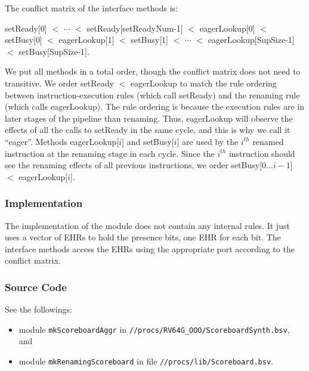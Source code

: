The conflict matrix of the interface methods is:
\begin{center}
    setReady[0] $<$ $\cdots$ $<$ setReady[setReadyNum-1] $<$ eagerLookup[0] $<$ setBusy[0] $<$ eagerLookup[1] $<$ setBusy[1] $<$ $\cdots$ $<$ eagerLookup[SupSize-1] $<$ setBusy[SupSize-1].
\end{center}
We put all methods in a total order, though the conflict matrix does not need to transitive.
We order setReady $<$ eagerLookup to match the rule ordering between instruction-execution rules (which call setReady) and the renaming rule (which calls eagerLookup).
The rule ordering is because the execution rules are in later stages of the pipeline than renaming.
Thus, eagerLookup will observe the effects of all the calls to setReady in the same cycle, and this is why we call it ``eager''.
Methods eagerLookup[$i$] and setBusy[$i$] are used by the $i^{th}$ renamed instruction at the renaming stage in each cycle.
Since the $i^{th}$ instruction should see the renaming effects of all previous instructions, we order setBusy[$0\ldots i-1$] $<$ eagerLookup[$i$].

\subsubsection{Implementation}
The implementation of the module does not contain any internal rules.
It just uses a vector of EHRs to hold the presence bits, one EHR for each bit.
The interface methods access the EHRs using the appropriate port according to the conflict matrix.

\subsubsection{Source Code}
See the followings:
\begin{itemize}
    \item module \texttt{mkScoreboardAggr} in \texttt{//procs/RV64G\_OOO/ScoreboardSynth.bsv}, and
    \item module \texttt{mkRenamingScoreboard} in file \texttt{//procs/lib/Scoreboard.bsv}.
\end{itemize}
  